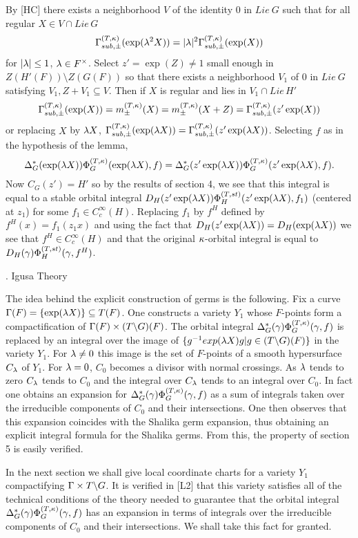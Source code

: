 \proof  By [HC] there exists a neighborhood $V$ of the identity $0$ in $Lie\ 
G$ such that for all regular $X \in V \cap Lie\, G$ 
$${\Gamma}_{sub,\pm}^{(T,{\kappa})}(\exp ({\lambda}^2X)) =
|{\lambda}|^2 {\Gamma}_{sub,\pm}^{(T,{\kappa})}(\exp (X))$$ for $|{\lambda}| \le 1$, ${\lambda} \in F^\times$.  Select
$z' = \exp(Z) \ne 1$ small enough in $Z(H'(F)) \setminus Z(G(F))$ so that there exists
a neighborhood $V_1$ of $0$ in $Lie \ G$ satisfying  $V_1, Z+V_1
\subseteq V$.  Then if $X$ is regular and lies in $V_1 \cap Lie\, H'$
$${\Gamma}_{sub,\pm}^{(T,{\kappa})}(\exp (X)) = m^{(T,{\kappa})}_{\pm}(X) = 
m^{(T,{\kappa})}_{\pm}(X+Z) =
{\Gamma}_{sub,\pm}^{(T,{\kappa})}(z' \exp(X))$$ or replacing $X$ by ${\lambda} X$, ${\Gamma}_{sub,\pm}^{(T,{\kappa})}(\exp
({\lambda} X)) = {\Gamma}_{sub,\pm}^{(T,{\kappa})}(z'\exp({\lambda} X))$.   Selecting $f$ as in the
hypothesis of the lemma, $$\Delta^*_G(\exp({\lambda} X))\Phi^{(T,\kappa)}_G(\exp ({\lambda} X),f) =
\Delta^*_G(z' \exp({\lambda} X))\Phi^{(T,\kappa)}_G(z'\exp({\lambda} X),f).$$  Now $C_G(z') = H'$ so by
the results of section 4,
we see that this
integral is equal to a stable orbital integral $D_H (z'\exp({\lambda}
X)) \Phi^{(T,st)}_H(z'\exp({\lambda} X),f_1)$ (centered at $z_1$) for some $f_1
\in C_c^\infty(H)$.  Replacing $f_1$ by $f^H$ defined by
$f^H(x) = f_1(z_1 x)$ and using the fact that $D_H(z'\exp({\lambda} X))
= D_H(\exp({\lambda} X))$  we see that $f^H \in C_c^\infty(H)$ and that the
original ${\kappa}$-orbital integral is equal to $D_H({\gamma})\Phi^{(T,st)}_H({\gamma},f^H)$.  

.	Igusa Theory
\endsect

The idea behind the explicit construction of germs is the following.  Fix a curve
$\Gamma(F) = \{\exp({\lambda} X)\} \subseteq T(F)$.  One constructs a
variety $Y_1$ whose $F$-points form a compactification of ${\Gamma}(F)
\times (T\backslash G)(F)$.  The orbital integral $\Delta^*_G({\gamma})
\Phi^{(T,\kappa)}_G({\gamma},f)$ is
replaced by an integral over the image of $\{ g{^{-1}} exp({\lambda} X)g | g \in
(T\backslash G)(F)\}$ in the variety $Y_1$.  For ${\lambda} \ne 0$ this
image is the set of $F$-points of a smooth hypersurface $C_{\lambda}$ of
$Y_1$.  For ${\lambda} = 0$, $C_0$ becomes a divisor
with normal crossings.  As ${\lambda}$ tends to zero $C_{\lambda}$ tends to $C_0$
and the integral over $C_{\lambda}$ tends to an integral over $C_0$. In
fact one obtains an expansion for $\Delta^*_G({\gamma})\Phi^{(T,\kappa)}_G({\gamma},f)$ as a sum of integrals
taken over the irreducible components of $C_0$ and their
intersections.  One then observes that this expansion coincides
with the Shalika germ expansion, thus obtaining an explicit integral
formula for the Shalika germs.  From this, the property of section 5
is easily verified.

In the next section we shall give local coordinate charts for a
variety $Y_1$ compactifying ${\Gamma} \times T\backslash G$.  It is
verified in [L2] that this variety satisfies all of the technical
conditions of the theory needed to guarantee that the orbital
integral $\Delta^*_G({\gamma})\Phi^{(T,\kappa)}_G({\gamma},f)$ has an expansion in terms of integrals over the irreducible
components of $C_0$ and their intersections.  We shall take this
fact for granted.

